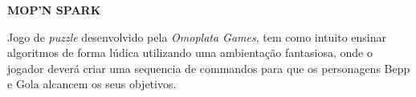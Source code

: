 \item \textbf{MOP'N SPARK}

Jogo de \textit{puzzle} desenvolvido pela \textit{Omoplata Games}, tem como
intuito ensinar algoritmos de forma lúdica utilizando uma ambientação
fantasiosa, onde o jogador deverá criar uma sequencia de commandos para que os
personagens Bepp e Gola alcancem os seus objetivos. \cite{MOPNSPARKSteam}



